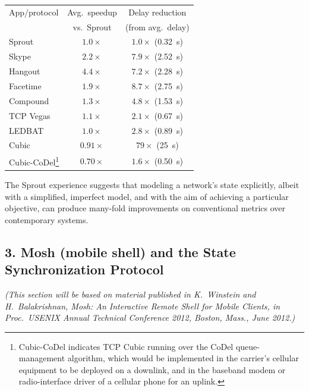 \documentclass{article}
\begin{document}
\begin{centering}

\noindent \begin{tabular}{|l|c|c|}
\hline
App/protocol & Avg.~speedup & Delay reduction \\
& \footnotesize{vs.~Sprout} & \footnotesize{(from avg.~delay)}\\
\hline
\hline
\cellcolor{blue!20}Sprout & \cellcolor{blue!20}$1.0\times$ & \cellcolor{blue!20}$1.0\times$ (0.32~s) \\
\hline
Skype & $2.2\times$ & $7.9\times$ (2.52~s) \\
Hangout & $4.4\times$ & $7.2\times$ (2.28~s) \\
Facetime & $1.9\times$ & $8.7\times$ (2.75~s) \\
\hline
Compound & $1.3\times$ & $4.8\times$ (1.53~s) \\
TCP Vegas & $1.1\times$ & $2.1\times$ (0.67~s) \\
LEDBAT & $1.0\times$ & $2.8\times$ (0.89~s) \\
Cubic & \cellcolor{red!20}$0.91\times$ & $79\times$ (25~s)\\
\hline
Cubic-CoDel\footnote{Cubic-CoDel indicates TCP Cubic running over the CoDel
queue-management algorithm, which would be implemented in the
carrier's cellular equipment to be deployed on a downlink, and in
the baseband modem or radio-interface driver of a cellular phone for an
uplink.} & \cellcolor{red!20}$0.70\times$ & $1.6\times$ (0.50~s) \\
\hline
\end{tabular}

\end{centering}

\vspace{\baselineskip}

The Sprout experience suggests that modeling a network's state
explicitly, albeit with a simplified, imperfect model, and with the
aim of achieving a particular objective, can produce many-fold
improvements on conventional metrics over contemporary systems.

\subsection*{3. Mosh (mobile shell) and the State Synchronization Protocol}

\emph{(This section will be based on material published in K.~Winstein
  and H.~Balakrishnan, Mosh: An Interactive Remote Shell for Mobile
  Clients, in Proc.~USENIX Annual Technical Conference 2012, Boston,
  Mass., June 2012.)}
\end{document}
